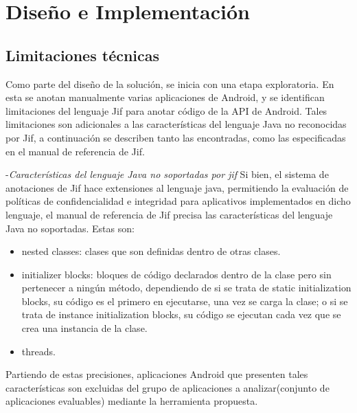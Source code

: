 \label{ch:desing}
\chapter{Diseño e Implementación}


\section{Limitaciones técnicas}
\label{sec:limitaciones}
Como parte del diseño de la solución, se inicia con una etapa exploratoria. En
esta se anotan manualmente varias aplicaciones de Android, y se identifican
limitaciones del lenguaje Jif para anotar código de la API de Android.
Tales limitaciones son adicionales a las características del lenguaje Java no
reconocidas por Jif, a continuación se describen tanto las encontradas, como las
especificadas en el manual de referencia de Jif.

-\textit{Características del lenguaje Java no soportadas por jif}\newline
Si bien, el sistema de anotaciones de Jif hace extensiones al lenguaje java,
permitiendo la evaluación de políticas de confidencialidad e integridad para
aplicativos implementados en dicho lenguaje, el manual de referencia de Jif
precisa las características del lenguaje Java no soportadas\cite{jifRef}. Estas
son:
\begin{itemize}
  \item nested classes: clases que son definidas dentro de otras clases.
  \item initializer blocks: bloques de código declarados dentro de la clase pero
  sin pertenecer a ningún método, dependiendo de si se trata de static
  initialization blocks, su código es el primero en ejecutarse, una vez se
  carga la clase; o si se trata de instance initialization blocks, su código se
  ejecutan cada vez que se crea una instancia de la clase.
\item threads.
\end{itemize} 
Partiendo de estas precisiones, aplicaciones Android que presenten tales
características son excluidas del grupo de aplicaciones a analizar(conjunto de
aplicaciones evaluables) mediante la herramienta propuesta.


